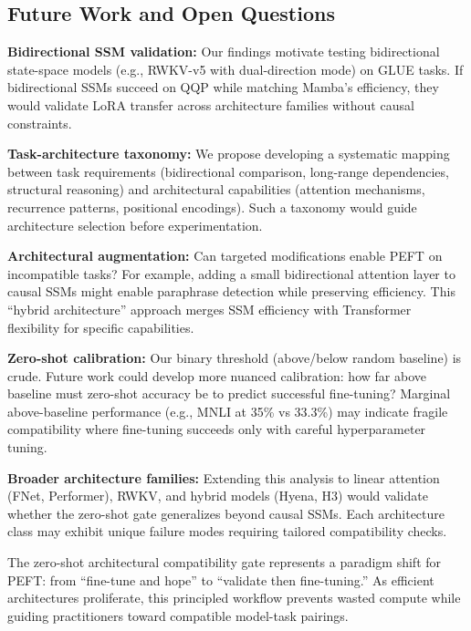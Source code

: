 \subsection{Future Work and Open Questions}

\textbf{Bidirectional SSM validation:} Our findings motivate testing bidirectional state-space models (e.g., RWKV-v5 with dual-direction mode) on GLUE tasks. If bidirectional SSMs succeed on QQP while matching Mamba's efficiency, they would validate LoRA transfer across architecture families without causal constraints.

\textbf{Task-architecture taxonomy:} We propose developing a systematic mapping between task requirements (bidirectional comparison, long-range dependencies, structural reasoning) and architectural capabilities (attention mechanisms, recurrence patterns, positional encodings). Such a taxonomy would guide architecture selection before experimentation.

\textbf{Architectural augmentation:} Can targeted modifications enable PEFT on incompatible tasks? For example, adding a small bidirectional attention layer to causal SSMs might enable paraphrase detection while preserving efficiency. This ``hybrid architecture'' approach merges SSM efficiency with Transformer flexibility for specific capabilities.

\textbf{Zero-shot calibration:} Our binary threshold (above/below random baseline) is crude. Future work could develop more nuanced calibration: how far above baseline must zero-shot accuracy be to predict successful fine-tuning? Marginal above-baseline performance (e.g., MNLI at 35\% vs 33.3\%) may indicate fragile compatibility where fine-tuning succeeds only with careful hyperparameter tuning.

\textbf{Broader architecture families:} Extending this analysis to linear attention (FNet, Performer), RWKV, and hybrid models (Hyena, H3) would validate whether the zero-shot gate generalizes beyond causal SSMs. Each architecture class may exhibit unique failure modes requiring tailored compatibility checks.

The zero-shot architectural compatibility gate represents a paradigm shift for PEFT: from ``fine-tune and hope'' to ``validate then fine-tuning.'' As efficient architectures proliferate, this principled workflow prevents wasted compute while guiding practitioners toward compatible model-task pairings.
